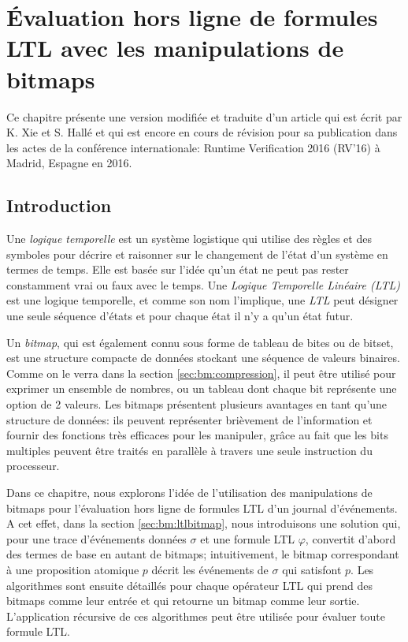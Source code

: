 
\chapter{Évaluation hors ligne de formules LTL avec les manipulations de bitmaps}

Ce chapitre présente une version modifiée et traduite d'un article qui est écrit par K. Xie et S. Hallé et qui est encore en cours de révision pour sa publication dans les actes de la conférence internationale: Runtime Verification 2016 (RV'16) à Madrid, Espagne en 2016.

\section{Introduction}\label{sec:bm:intro} %

Une \emph{logique temporelle} \citep{huth2004} est un système logistique qui utilise des règles et des symboles pour décrire et raisonner sur le changement de l'état d'un système en termes de temps. Elle est basée sur l'idée qu'un état ne peut pas rester constamment vrai ou faux avec le temps. Une \emph{Logique Temporelle Linéaire (LTL)} \citep{pnueli97} est une logique temporelle, et comme son nom l'implique, une \emph{LTL} peut désigner une seule séquence d'états et pour chaque état il n'y a qu'un état futur.

Un \emph{bitmap}, qui est également connu sous forme de tableau de bites ou de bitset, est une structure compacte de données stockant une séquence de valeurs binaires. Comme on le verra dans la section \ref{sec:bm:compression}, il peut être utilisé pour exprimer un ensemble de nombres, ou un tableau dont chaque bit représente une option de 2 valeurs. Les bitmaps présentent plusieurs avantages en tant qu'une structure de données: ils peuvent représenter brièvement de l'information et fournir des fonctions très efficaces pour les manipuler, grâce au fait que les bits multiples peuvent être traités en parallèle à travers une seule instruction du processeur.

Dans ce chapitre, nous explorons l'idée de l'utilisation des manipulations de bitmaps pour l'évaluation hors ligne de formules LTL d'un journal d'événements. A cet effet, dans la section \ref{sec:bm:ltlbitmap}, nous introduisons une solution qui, pour une trace d'événements données $\sigma$ et une formule LTL $\varphi$, convertit d'abord des termes de base en autant de bitmaps; intuitivement, le bitmap correspondant à une proposition atomique $p$ décrit les événements de $\sigma$ qui satisfont $p$. Les algorithmes sont ensuite détaillés pour chaque opérateur LTL qui prend des bitmaps comme leur entrée et qui retourne un bitmap comme leur sortie. L'application récursive de ces algorithmes peut être utilisée pour évaluer toute formule LTL.

